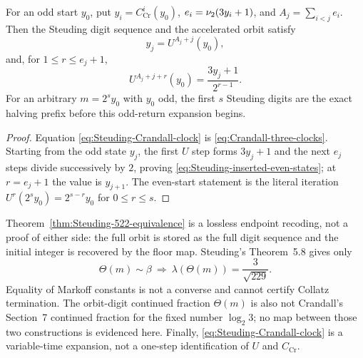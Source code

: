 \begin{proposition}
\label{prop:Steuding-Crandall-crosswalk}
For an odd start $y_0$, put $y_i=C_{\mathrm{Cr}}^i(y_0)$,
$e_i=\nu_{2}(3y_i+1)$, and $A_j=\sum_{i<j}e_i$.  Then the Steuding digit
sequence and the accelerated orbit satisfy
\begin{equation}
\label{eq:Steuding-Crandall-clock}
 y_j=U^{A_j+j}(y_0),
\end{equation}
and, for $1\leq r\leq e_j+1$,
\begin{equation}
\label{eq:Steuding-inserted-even-states}
 U^{A_j+j+r}(y_0)=\frac{3y_j+1}{2^{r-1}}.
\end{equation}
For an arbitrary $m=2^s y_0$ with $y_0$ odd, the first $s$ Steuding digits
are the exact halving prefix before this odd-return expansion begins.
\end{proposition}

\begin{proof}
Equation \eqref{eq:Steuding-Crandall-clock} is
\eqref{eq:Crandall-three-clocks}.  Starting from the odd state $y_j$, the
first $U$ step forms $3y_j+1$ and the next $e_j$ steps divide successively by
$2$, proving \eqref{eq:Steuding-inserted-even-states}; at $r=e_j+1$ the
value is $y_{j+1}$.  The even-start statement is the literal iteration
$U^r(2^s y_0)=2^{s-r}y_0$ for $0\leq r\leq s$.
\end{proof}

\begin{nonclaim}
\label{nonclaim:Steuding-Markoff-boundary}
Theorem~\ref{thm:Steuding-522-equivalence} is a lossless endpoint recoding,
not a proof of either side: the full orbit is stored as the full digit
sequence and the initial integer is recovered by the floor map.  Steuding's
Theorem~5.8 gives only
\[
 \Theta(m)\sim\beta
 \ \Longrightarrow\ 
 \lambda(\Theta(m))=\frac3{\sqrt{229}}.
\]
Equality of Markoff constants is not a converse and cannot certify Collatz
termination.  The orbit-digit continued fraction $\Theta(m)$ is also not
Crandall's Section~7 continued fraction for the fixed number $\log_2 3$;
no map between those two constructions is evidenced here.  Finally,
\eqref{eq:Steuding-Crandall-clock} is a variable-time expansion, not a
one-step identification of $U$ and $C_{\mathrm{Cr}}$.
\end{nonclaim}
